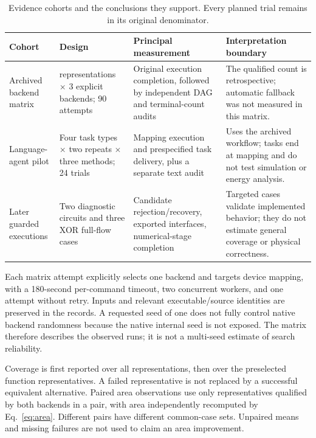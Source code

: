 \documentclass[ASNA,twocolumn]{USG}
\begin{document}
\begin{table}[t]
\caption{Evidence cohorts and the conclusions they support. Every planned trial remains in its original denominator.}
\label{tab:cohorts}
\centering\small
\begin{tabular}{@{}>{\raggedright\arraybackslash}p{29mm}>{\raggedright\arraybackslash}p{37mm}>{\raggedright\arraybackslash}p{46mm}>{\raggedright\arraybackslash}p{49mm}@{}}
\toprule
Cohort & Design & Principal measurement & Interpretation boundary\\
\midrule
Archived backend matrix & 30 representations $\times$ 3 explicit backends; 90 attempts & Original execution completion, followed by independent DAG and terminal-count audits & The qualified count is retrospective; automatic fallback was not measured in this matrix.\\
Language-agent pilot & Four task types $\times$ two repeats $\times$ three methods; 24 trials & Mapping execution and prespecified task delivery, plus a separate text audit & Uses the archived workflow; tasks end at mapping and do not test simulation or energy analysis.\\
Later guarded executions & Two diagnostic circuits and three XOR full-flow cases & Candidate rejection/recovery, exported interfaces, numerical-stage completion & Targeted cases validate implemented behavior; they do not estimate general coverage or physical correctness.\\
\bottomrule
\end{tabular}
\end{table}

Each matrix attempt explicitly selects one backend and targets device mapping, with a 180-second per-command timeout, two concurrent workers, and one attempt without retry. Inputs and relevant executable/source identities are preserved in the records. A requested seed of one does not fully control native backend randomness because the native internal seed is not exposed. The matrix therefore describes the observed runs; it is not a multi-seed estimate of search reliability.

Coverage is first reported over all representations, then over the preselected function representatives. A failed representative is not replaced by a successful equivalent alternative. Paired area observations use only representatives qualified by both backends in a pair, with area independently recomputed by Eq.~\eqref{eq:area}. Different pairs have different common-case sets. Unpaired means and missing failures are not used to claim an area improvement.
\end{document}

